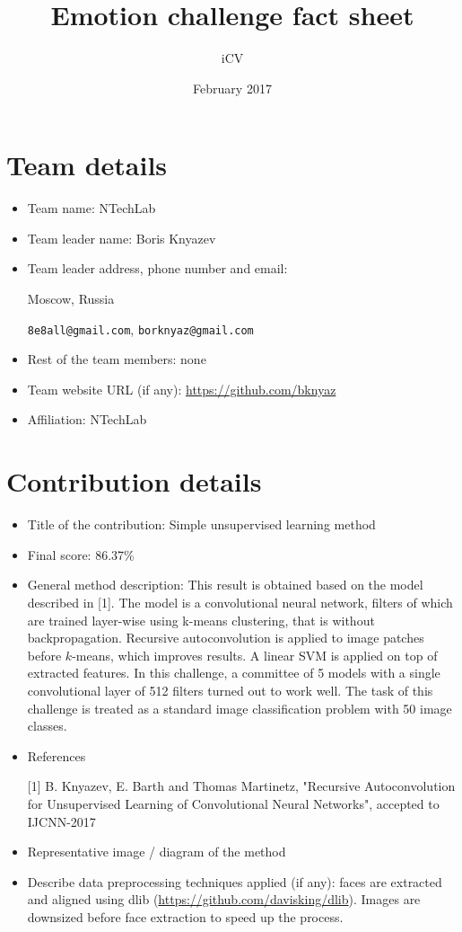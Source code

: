 \documentclass{article}
\title{Emotion challenge fact sheet}
\author{iCV}
\date{February 2017}
\begin{document}
\maketitle

\section{Team details}

\begin{itemize}
\item Team name: NTechLab                                  
\item Team leader name: Boris Knyazev                           
\item Team leader address, phone number and email: 

Moscow, Russia

\texttt{8e8all@gmail.com}, \texttt{borknyaz@gmail.com}

\item Rest of the team members: none                    
\item Team website URL (if any): \url{https://github.com/bknyaz}
\item Affiliation: NTechLab
\end{itemize}

\section{Contribution details}

\begin{itemize}
\item Title of the contribution: Simple unsupervised learning method
\item Final score: 86.37\%                                              
\item General method description: This result is obtained based on the model described in [1]. The model is a convolutional neural network, filters of which are trained layer-wise using k-means clustering, that is without backpropagation. Recursive autoconvolution is applied to image patches before $k$-means, which improves results. A linear SVM is applied on top of extracted features. In this challenge, a committee of 5 models with a single convolutional layer of 512 filters turned out to work well.
The task of this challenge is treated as a standard image classification problem with 50 image classes.

\item References

[1] B. Knyazev, E. Barth and Thomas Martinetz, "Recursive Autoconvolution for Unsupervised Learning of Convolutional Neural Networks", accepted to IJCNN-2017
\item Representative image / diagram of the method        
\item Describe data preprocessing techniques applied (if any): faces are extracted and aligned using dlib (\url{https://github.com/davisking/dlib}). Images are downsized before face extraction to speed up the process.
\end{itemize}
\end{document}
